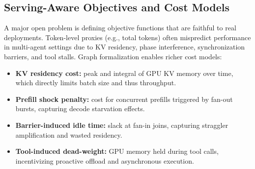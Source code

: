 

\subsection{Serving-Aware Objectives and Cost Models}
\label{sec:serving_aware_objectives}

A major open problem is defining objective functions that are faithful to real deployments. Token-level proxies (e.g., total tokens) often mispredict performance in multi-agent settings due to KV residency, phase interference, synchronization barriers, and tool stalls. Graph formalization enables richer cost models:

\begin{itemize}
  \item \textbf{KV residency cost:} peak and integral of GPU KV memory over time, which directly limits batch size and thus throughput.
  \item \textbf{Prefill shock penalty:} cost for concurrent prefills triggered by fan-out bursts, capturing decode starvation effects.
  \item \textbf{Barrier-induced idle time:} slack at fan-in joins, capturing straggler amplification and wasted residency.
  \item \textbf{Tool-induced dead-weight:} GPU memory held during tool calls, incentivizing proactive offload and asynchronous execution.
\end{itemize}

